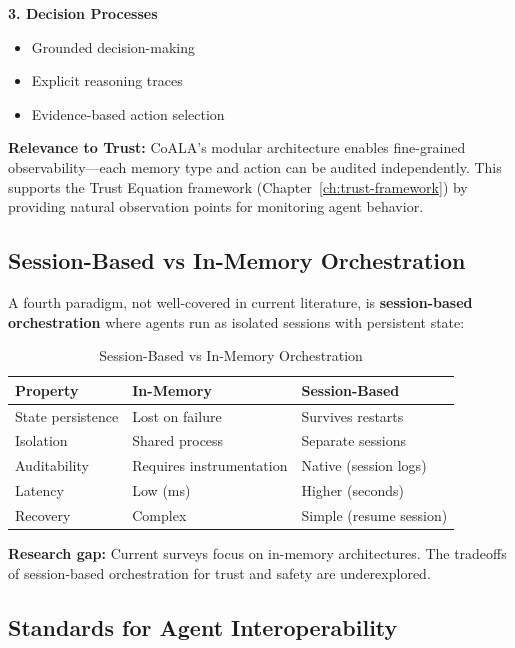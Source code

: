 \textbf{3. Decision Processes}
\begin{itemize}
    \item Grounded decision-making
    \item Explicit reasoning traces
    \item Evidence-based action selection
\end{itemize}

\textbf{Relevance to Trust:} CoALA's modular architecture enables fine-grained observability---each memory type and action can be audited independently. This supports the Trust Equation framework (Chapter~\ref{ch:trust-framework}) by providing natural observation points for monitoring agent behavior.

\subsection{Session-Based vs In-Memory Orchestration}
\label{subsec:session-vs-inmemory}

A fourth paradigm, not well-covered in current literature, is \textbf{session-based orchestration} where agents run as isolated sessions with persistent state:

\begin{table}[htbp]
\centering
\caption{Session-Based vs In-Memory Orchestration}
\label{tab:session-vs-inmemory}
\begin{tabular}{lll}
\toprule
\textbf{Property} & \textbf{In-Memory} & \textbf{Session-Based} \\
\midrule
State persistence & Lost on failure & Survives restarts \\
Isolation & Shared process & Separate sessions \\
Auditability & Requires instrumentation & Native (session logs) \\
Latency & Low (ms) & Higher (seconds) \\
Recovery & Complex & Simple (resume session) \\
\bottomrule
\end{tabular}
\end{table}

\textbf{Research gap:} Current surveys focus on in-memory architectures. The tradeoffs of session-based orchestration for trust and safety are underexplored.

\subsection{Standards for Agent Interoperability}
\label{subsec:agent-standards}

